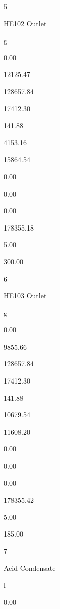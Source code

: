\documentclass[a4paper,portrait,12pt]{article}
\begin{document}
5


\begin{flushleft}
HE102 Outlet
\end{flushleft}


\begin{flushleft}
g
\end{flushleft}


0.00


12125.47


128657.84


17412.30


141.88


4153.16


15864.54


0.00


0.00


0.00


178355.18


5.00


300.00





6


\begin{flushleft}
HE103 Outlet
\end{flushleft}


\begin{flushleft}
g
\end{flushleft}


0.00


9855.66


128657.84


17412.30


141.88


10679.54


11608.20


0.00


0.00


0.00


178355.42


5.00


185.00





7


\begin{flushleft}
Acid Condensate
\end{flushleft}


\begin{flushleft}
l
\end{flushleft}


0.00
\end{document}
